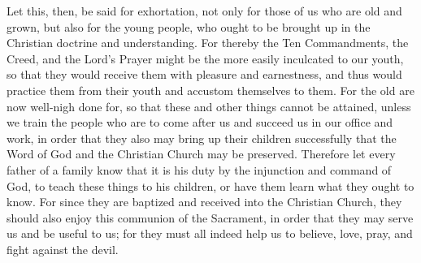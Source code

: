 Let this, then, be said for exhortation, not only for those of us who
are old and grown, but also for the young people, who ought to be
brought up in the Christian doctrine and understanding. For thereby the
Ten Commandments, the Creed, and the Lord's Prayer might be the more
easily inculcated to our youth, so that they would receive them with
pleasure and earnestness, and thus would practice them from their youth
and accustom themselves to them. For the old are now well-nigh done
for, so that these and other things cannot be attained, unless we train
the people who are to come after us and succeed us in our office and
work, in order that they also may bring up their children successfully
that the Word of God and the Christian Church may be preserved.
Therefore let every father of a family know that it is his duty by the
injunction and command of God, to teach these things to his children,
or have them learn what they ought to know. For since they are baptized
and received into the Christian Church, they should also enjoy this
communion of the Sacrament, in order that they may serve us and be
useful to us; for they must all indeed help us to believe, love, pray,
and fight against the devil.
